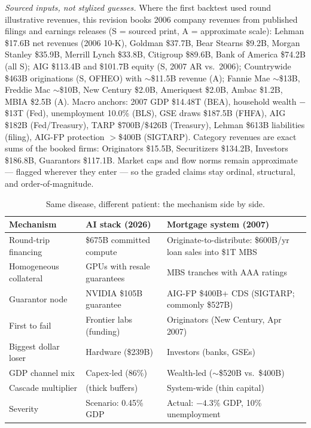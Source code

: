 \documentclass[11pt,a4paper]{article}
\begin{document}
\emph{Sourced inputs, not stylized guesses.} Where the first backtest used
round illustrative revenues, this revision books 2006 company revenues from
published filings and earnings releases (S = sourced print, A = approximate
scale): Lehman \$17.6B net revenues (2006 10-K), Goldman \$37.7B, Bear
Stearns \$9.2B, Morgan Stanley \$35.9B, Merrill Lynch \$33.8B, Citigroup
\$89.6B, Bank of America \$74.2B (all S); AIG \$113.4B and \$101.7B equity
(S, 2007 AR vs.\ 2006); Countrywide \$463B originations (S, OFHEO) with
$\sim$\$11.5B revenue (A); Fannie Mae $\sim$\$13B, Freddie Mac
$\sim$\$10B, New Century \$2.0B, Ameriquest \$2.0B, Ambac \$1.2B, MBIA
\$2.5B (A). Macro anchors: 2007 GDP \$14.48T (BEA), household wealth
$-$\$13T (Fed), unemployment 10.0\% (BLS), GSE draws \$187.5B (FHFA), AIG
\$182B (Fed/Treasury), TARP \$700B/\$426B (Treasury), Lehman \$613B
liabilities (filing), AIG-FP protection $>$\$400B (SIGTARP). Category
revenues are exact sums of the booked firms: Originators \$15.5B,
Securitizers \$134.2B, Investors \$186.8B, Guarantors \$117.1B. Market caps
and flow norms remain approximate --- flagged wherever they enter --- so
the graded claims stay ordinal, structural, and order-of-magnitude.

\begin{table}[htbp]
\centering
\caption{Same disease, different patient: the mechanism side by side.}
    \label{tab:34-same-disease-different}
\begin{tabular}{>{\raggedright\arraybackslash}p{2.7cm}>{\raggedright\arraybackslash}p{4.2cm}>{\raggedright\arraybackslash}p{4.2cm}}
\toprule
Mechanism & AI stack (2026) & Mortgage system (2007) \\
\midrule
Round-trip financing & \$675B committed compute & Originate-to-distribute: \$600B/yr loan sales into \$1T MBS \\
Homogeneous collateral & GPUs with resale guarantees & MBS tranches with AAA ratings \\
Guarantor node & NVIDIA \$105B guarantee & AIG-FP \$400B+ CDS (SIGTARP; commonly \$527B) \\
First to fail & Frontier labs (funding) & Originators (New Century, Apr 2007) \\
Biggest dollar loser & Hardware (\$239B) & Investors (banks, GSEs) \\
GDP channel mix & Capex-led (86\%) & Wealth-led ($\sim$\$520B vs.\ \$400B) \\
Cascade multiplier & 1.032 (thick buffers) & System-wide (thin capital) \\
Severity & Scenario: 0.45\% GDP & Actual: $-4.3\%$ GDP, 10\% unemployment \\
\bottomrule
\end{tabular}
\end{table}
\end{document}
